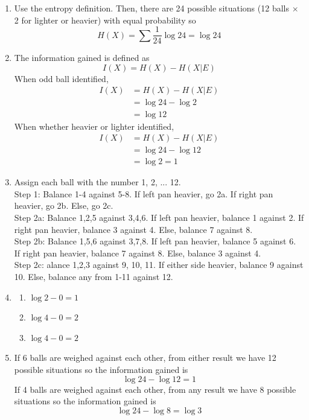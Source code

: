 \documentclass[12pt, a4paper]{article}
\begin{document}
\begin{sol}
\begin{enumerate}
    \item[(a)] Use the entropy definition. Then, there are 24 possible situations (12 balls $\times$ 2 for lighter or heavier) with equal probability so
    $$H(X) = \sum \frac{1}{24} \log 24 = \log 24$$
    \item[(b)] 
    The information gained is defined as
    $$I(X) = H(X) - H(X|E)$$
    When odd ball identified, 
    \begin{align*}
        I(X) &= H(X) - H(X|E) \\
        &= \log 24 - \log 2 \\
        &= \log 12
    \end{align*}
    When whether heavier or lighter identified,
    \begin{align*}
        I(X) &= H(X) - H(X|E) \\
        &= \log 24 - \log 12 \\
        &= \log 2 = 1
    \end{align*}
    \item[(c)]
    Assign each ball with the number 1, 2, ... 12. \\
    Step 1: Balance 1-4 against 5-8. If left pan heavier, go 2a. If right pan heavier, go 2b. Else, go 2c. \\
    Step 2a: Balance 1,2,5 against 3,4,6. If left pan heavier, balance 1 against 2. If right pan heavier, balance 3 against 4. Else, balance 7 against 8. \\
    Step 2b: Balance 1,5,6 against 3,7,8. If left pan heavier, balance 5 against 6. If right pan heavier, balance 7 against 8. Else, balance 3 against 4. \\
    Step 2c: alance 1,2,3 against 9, 10, 11. If either side heavier, balance 9 against 10. Else, balance any from 1-11 against 12. \\
    \item[(d)] \begin{enumerate}
        \item[(i)] $\log 2 - 0 = 1$
        \item[(ii)] $\log 4 - 0 = 2$
        \item[(iii)] $\log 4 - 0 = 2$
    \end{enumerate}  
    \item[(e)] If 6 balls are weighed against each other, from either result we have 12 possible situations so the information gained is
    $$\log 24 - \log 12 = 1$$
    If 4 balls are weighed against each other, from any result we have 8 possible situations so the information gained is
    $$\log 24 - \log 8 = \log 3$$
\end{enumerate}
\end{sol}
\bigskip
\end{document}
